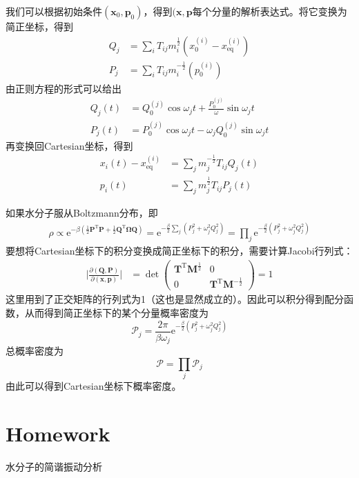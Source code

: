     我们可以根据初始条件$(\bm{x}_0,\bm{p}_0)$，得到$(\bm{x},\bm{p}$每个分量的解析表达式。将它变换为简正坐标，得到
    \begin{align*}
        Q_j &= \sum_i T_{ij} m_i^{\frac 12} (x_0^{(i)} - x_\mathrm{eq}^{(i)})\\
        P_j &= \sum_i T_{ij} m_i^{-\frac 12} (p_0^{(i)})
    \end{align*}
    由正则方程的形式可以给出
    \begin{align*}
        Q_j(t) &= Q_0^{(j)}\cos{\omega_j t} + \frac {P_0^{(j)}}{\omega} \sin{\omega_j t}\\
        P_j(t) &= P_0^{(j)}\cos{\omega_j t} - \omega_j Q_0^{(j)} \sin{\omega_j t}
    \end{align*}
    再变换回Cartesian坐标，得到
    \begin{align*}
        x_i(t) - x_\mathrm{eq}^{(i)} &= \sum_j m_j^{-\frac 12} T_{ij} Q_j(t)\\
        p_i(t) &= \sum_j m_j^{\frac 12} T_{ij}P_j(t)
    \end{align*}

    如果水分子服从Boltzmann分布，即
    \begin{align*}
        \rho \propto \mathrm{e}^{-\beta (\frac 12 \bm{P}^\mathrm{T}\bm{P} + \frac 12 \bm{Q}^\mathrm{T} \bm{\Omega Q})} = \mathrm{e}^{- \frac {\beta}2 \sum_j (P_j^2 + \omega_j^2 Q_j^2)} = \prod_j \mathrm{e}^{-\frac {\beta}2 (P_j^2 + \omega_j^2 Q_j^2)}
    \end{align*}
    要想将Cartesian坐标下的积分变换成简正坐标下的积分，需要计算Jacobi行列式：
    \begin{align*}
        \bigg|\frac {\partial (\bm{Q,P})}{\partial (\bm{x,p})}\bigg| &= \det
        \begin{pmatrix}
            \bm{T}^\mathrm{T}\bm{M}^{\frac 12} & 0\\
            0 & \bm{T}^\mathrm{T}\bm{M}^{-\frac 12}
        \end{pmatrix}
        = 1
    \end{align*}
    这里用到了正交矩阵的行列式为1（这也是显然成立的）。因此可以积分得到配分函数，从而得到简正坐标下的某个分量概率密度为
    \begin{equation*}
        \mathcal{P}_j = \frac {2\pi}{\beta\omega_j} \mathrm{e}^{-\frac {\beta}2 (P_j^2 + \omega_j^2 Q_j^2)}
    \end{equation*}
    总概率密度为
    \begin{equation*}
        \mathcal{P} = \prod_j \mathcal{P}_j
    \end{equation*}
    由此可以得到Cartesian坐标下概率密度。

    \section{Homework}
    \begin{asg}
        水分子的简谐振动分析
    \end{asg}


    
    
